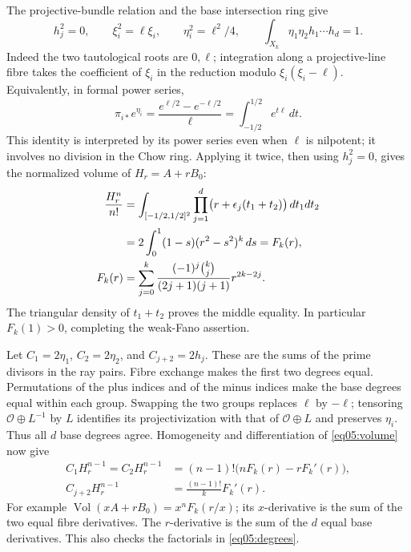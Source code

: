 \documentclass[11pt]{amsart}
\theoremstyle{definition}
\theoremstyle{remark}
\newcommand{\cO}{\mathcal O}
\begin{document}
The projective-bundle relation and the base intersection ring give
\begin{equation}\label{eq05:ring}
 h_j^2=0,\qquad \xi_i^2=\ell\xi_i,\qquad
 \eta_i^2=\ell^2/4,\qquad
 \int_{X_k}\eta_1\eta_2h_1\cdots h_d=1.
\end{equation}
Indeed the two tautological roots are \(0,\ell\); integration along
a projective-line fibre takes the coefficient of \(\xi_i\) in
the reduction modulo \(\xi_i(\xi_i-\ell)\). Equivalently, in formal
power series,
\[
 \pi_{i*}e^{\eta_i}
  =\frac{e^{\ell/2}-e^{-\ell/2}}{\ell}
  =\int_{-1/2}^{1/2}e^{t\ell}\,dt.
\]
This identity is interpreted by its power series even when \(\ell\)
is nilpotent; it involves no division in the Chow ring. Applying it
twice, then using \(h_j^2=0\), gives the normalized volume of
\(H_r=A+rB_0\):
\begin{align}
 \frac{H_r^n}{n!}
 &=\int_{[-1/2,1/2]^2}\prod_{j=1}^d
              \bigl(r+\epsilon_j(t_1+t_2)\bigr)\,dt_1dt_2\notag\\
 &=2\int_0^1(1-s)(r^2-s^2)^k\,ds
 =F_k(r),\label{eq05:volume}\\
 F_k(r)&=\sum_{j=0}^k
   \frac{(-1)^j\binom{k}{j}}{(2j+1)(j+1)}r^{2k-2j}.
   \label{eq05:polynomial}
\end{align}
The triangular density of \(t_1+t_2\) proves the middle equality.
In particular \(F_k(1)>0\), completing the weak-Fano assertion.

Let \(C_1=2\eta_1\), \(C_2=2\eta_2\), and
\(C_{j+2}=2h_j\). These are the sums of the prime divisors in the
ray pairs. Fibre exchange makes the first two degrees equal.
Permutations of the plus indices and of the minus indices make the
base degrees equal within each group. Swapping the two groups
replaces \(\ell\) by \(-\ell\); tensoring
\(\cO\oplus L^{-1}\) by \(L\) identifies its projectivization
with that of \(\cO\oplus L\) and preserves \(\eta_i\).
Thus all \(d\) base degrees agree. Homogeneity and differentiation
of \eqref{eq05:volume} now give
\begin{equation}\label{eq05:degrees}
 \begin{aligned}
 C_1H_r^{n-1}=C_2H_r^{n-1}
   &=(n-1)!\bigl(nF_k(r)-rF_k'(r)\bigr),\\
 C_{j+2}H_r^{n-1}&=\frac{(n-1)!}{k}F_k'(r).
 \end{aligned}
\end{equation}
For example \(\operatorname{Vol}(xA+rB_0)=x^nF_k(r/x)\);
its \(x\)-derivative is the sum of the two equal fibre derivatives.
The \(r\)-derivative is the sum of the \(d\) equal base derivatives.
This also checks the factorials in \eqref{eq05:degrees}.
\end{document}
